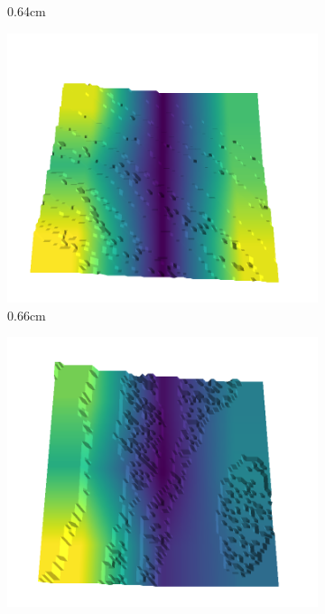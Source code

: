\documentclass[../document.tex]{subfiles}
\begin{document}
\begin{figure}[H]
\begin{subfigure}[b]{0.192\linewidth}
    \caption{0.64cm}
    \label{fig : quarry-best-16}
    \end{subfigure}
    \begin{subfigure}[b]{0.192\linewidth}
    \includegraphics[width=\linewidth]{../img/5/quarry/best/65-patch-3d-majavi-colormap-160.png}
    \caption{0.66cm}
    \label{fig : quarry-best-17}
    \end{subfigure}
    \begin{subfigure}[b]{0.192\linewidth}
    \includegraphics[width=\linewidth]{../img/5/quarry/best/67-patch-3d-majavi-colormap-170.png}

\end{subfigure}
\end{figure}
\end{document}
